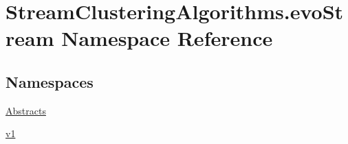\hypertarget{namespaceStreamClusteringAlgorithms_1_1evoStream}{}\section{Stream\+Clustering\+Algorithms.\+evo\+Stream Namespace Reference}
\label{namespaceStreamClusteringAlgorithms_1_1evoStream}
\subsection*{Namespaces}
\begin{DoxyCompactItemize}
\item 
 \hyperlink{namespaceStreamClusteringAlgorithms_1_1evoStream_1_1Abstracts}{Abstracts}
\item 
 \hyperlink{namespaceStreamClusteringAlgorithms_1_1evoStream_1_1v1}{v1}
\end{DoxyCompactItemize}
